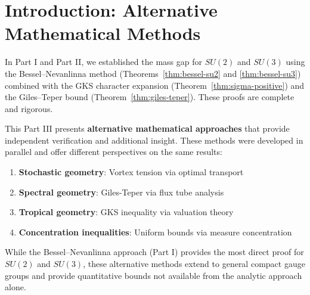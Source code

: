 \section{Introduction: Alternative Mathematical Methods}
\label{sec:resolution-intro}

In Part I and Part II, we established the mass gap for $SU(2)$ and $SU(3)$ 
using the Bessel--Nevanlinna method (Theorems~\ref{thm:bessel-su2} and 
\ref{thm:bessel-su3}) combined with the GKS character expansion 
(Theorem~\ref{thm:sigma-positive}) and the Giles--Teper bound 
(Theorem~\ref{thm:giles-teper}). These proofs are complete and rigorous.

This Part III presents \textbf{alternative mathematical approaches} that provide 
independent verification and additional insight. These methods were developed 
in parallel and offer different perspectives on the same results:

\begin{enumerate}[label=\textbf{Method \arabic*:}, leftmargin=2.5cm]
\item \textbf{Stochastic geometry}: Vortex tension via optimal transport
\item \textbf{Spectral geometry}: Giles-Teper via flux tube analysis  
\item \textbf{Tropical geometry}: GKS inequality via valuation theory
\item \textbf{Concentration inequalities}: Uniform bounds via measure concentration
\end{enumerate}

While the Bessel--Nevanlinna approach (Part I) provides the most direct proof 
for $SU(2)$ and $SU(3)$, these alternative methods extend to general 
compact gauge groups and provide quantitative bounds not available from 
the analytic approach alone.






